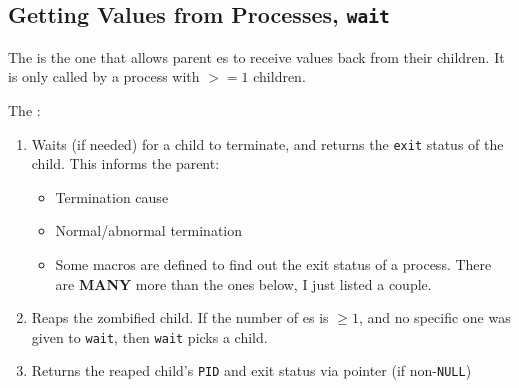 \subsection{Getting Values from Processes, \texttt{wait}}\label{subsec:Values_from_Processes-wait}
The   is the one that allows parent es to receive values back from their children.
It is only called by a process with $>= 1$ children.

The  :
\begin{enumerate}[noitemsep]
\item Waits (if needed) for a child to terminate, and returns the \texttt{exit} status of the child.
  This informs the parent:
  \begin{itemize}[noitemsep]
  \item Termination cause
  \item Normal/abnormal termination
  \item Some macros are defined to find out the exit status of a process.
    There are \textbf{MANY} more than the ones below, I just listed a couple.
  \end{itemize}

\item Reaps the zombified child.
  If the number of es is $\geq 1$, and no specific one was given to \texttt{wait}, then \texttt{wait} picks a child.
\item Returns the reaped child's \texttt{PID} and exit status via pointer (if non-\texttt{NULL})
\end{enumerate}



